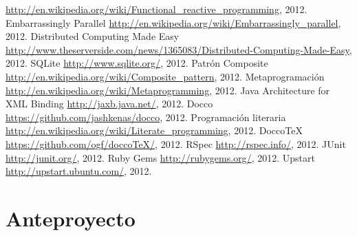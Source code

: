 \documentclass[a4paper,12pt,twoside]{report}
\begin{document}
\begin{thebibliography}{1}
  \newblock
  \url{http://en.wikipedia.org/wiki/Functional_reactive_programming}, 2012.
  \newblock Embarrassingly Parallel
  \newblock \url{http://en.wikipedia.org/wiki/Embarrassingly_parallel}, 2012.
  \newblock Distributed Computing Made Easy
  \newblock
  \url{http://www.theserverside.com/news/1365083/Distributed-Computing-Made-Easy},
  2012.
  \newblock SQLite
  \newblock \url{http://www.sqlite.org/}, 2012.
  \newblock Patrón Composite
  \newblock \url{http://en.wikipedia.org/wiki/Composite_pattern},
  2012.
  \newblock Metaprogramación
  \newblock \url{http://en.wikipedia.org/wiki/Metaprogramming}, 2012.
  \newblock Java Architecture for XML Binding
  \newblock \url{http://jaxb.java.net/}, 2012.
  \newblock Docco
  \newblock \url{https://github.com/jashkenas/docco}, 2012.
  \newblock Programación literaria
  \newblock \url{http://en.wikipedia.org/wiki/Literate_programming},
  2012.
  \newblock DoccoTeX
  \newblock \url{https://github.com/ogf/doccoTeX/}, 2012.
  \newblock RSpec
  \newblock \url{http://rspec.info/}, 2012.
  \newblock JUnit
  \newblock \url{http://junit.org/}, 2012.
  \newblock Ruby Gems
  \newblock \url{http://rubygems.org/}, 2012.
  \newblock Upstart
  \newblock \url{http://upstart.ubuntu.com/}, 2012.
\end{thebibliography}

\appendix
\addappheadtotoc
\chapter{Anteproyecto}
\label{ANTEPROYECTO}
\end{document}
